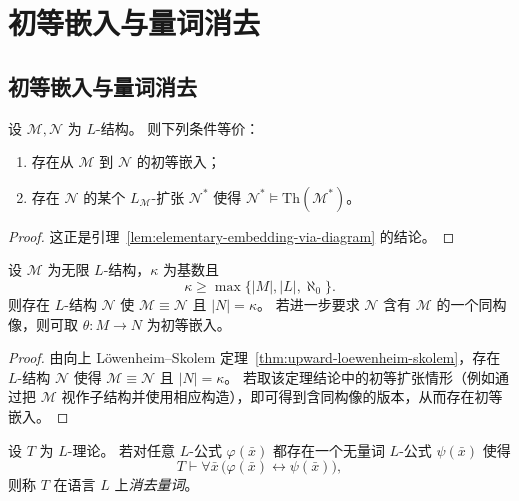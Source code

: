 \documentclass[lang=cn,a4paper,newtx,section]{elegantbook}
\begin{document}
\chapter{初等嵌入与量词消去}

\section{初等嵌入与量词消去}

\begin{theorem}
\label{elementary-embedding-theory-characterization}
设 $\mathcal M,\mathcal N$ 为 $L$-结构。
则下列条件等价：
\begin{enumerate}
  \item 存在从 $\mathcal M$ 到 $\mathcal N$ 的初等嵌入；
  \item 存在 $\mathcal N$ 的某个 $L_{\mathcal M}$-扩张 $\mathcal N^*$ 使得 $\mathcal N^*\models\mathrm{Th}(\mathcal M^*)$。
\end{enumerate}
\end{theorem}

\begin{proof}
这正是引理~\ref{lem:elementary-embedding-via-diagram} 的结论。
\end{proof}

\begin{corollary}
\label{arbitrarily-large-elementary-extensions}
设 $\mathcal M$ 为无限 $L$-结构，$\kappa$ 为基数且
\[
  \kappa\ge\max\{\lvert M\rvert,\lvert L\rvert,\aleph_0\}.
\]
则存在 $L$-结构 $\mathcal N$ 使 $\mathcal M\equiv\mathcal N$ 且 $\lvert N\rvert=\kappa$。
若进一步要求 $\mathcal N$ 含有 $\mathcal M$ 的一个同构像，则可取 $\theta:M\to N$ 为初等嵌入。
\end{corollary}

\begin{proof}
由向上 Löwenheim--Skolem 定理~\ref{thm:upward-loewenheim-skolem}，存在 $L$-结构 $\mathcal N$ 使得 $\mathcal M\equiv\mathcal N$ 且 $\lvert N\rvert=\kappa$。
若取该定理结论中的初等扩张情形（例如通过把 $\mathcal M$ 视作子结构并使用相应构造），即可得到含同构像的版本，从而存在初等嵌入。
\end{proof}

\begin{definition}[量词消去]
\label{quantifier-elimination}
设 $T$ 为 $L$-理论。
若对任意 $L$-公式 $\varphi(\bar x)$ 都存在一个无量词 $L$-公式 $\psi(\bar x)$ 使得
\[
  T\vdash\forall\bar x\,\bigl(\varphi(\bar x)\leftrightarrow\psi(\bar x)\bigr),
\]
则称 $T$ 在语言 $L$ 上\emph{消去量词}。
\end{definition}
\end{document}
